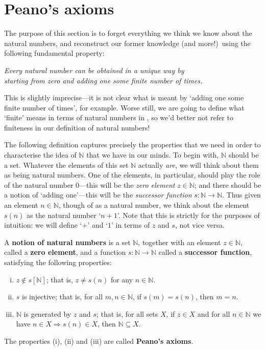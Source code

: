 \section{Peano's axioms}

The purpose of this section is to forget everything we think we know about the natural numbers, and reconstruct our former knowledge (and more!)\ using the following fundamental property:

\begin{center}
\textit{Every natural number can be obtained in a unique way by\\
starting from zero and adding one some finite number of times.}
\end{center}

This is slightly imprecise---it is not clear what is meant by `adding one some finite number of times', for example. Worse still, we are going to define what `finite' means in terms of natural numbers in , so we'd better not refer to finiteness in our definition of natural numbers!

The following definition captures precisely the properties that we need in order to characterise the idea of $\mathbb{N}$ that we have in our minds. To begin with, $\mathbb{N}$ should be a set. Whatever the elements of this set $\mathbb{N}$ actually \textit{are}, we will think about them as being natural numbers. One of the elements, in particular, should play the role of the natural number $0$---this will be the \textit{zero element} $z \in \mathbb{N}$; and there should be a notion of `adding one'---this will be the \textit{successor function} $s : \mathbb{N} \to \mathbb{N}$. Thus given an element $n \in \mathbb{N}$, though of as a natural number, we think about the element $s(n)$ as the natural number `$n+1$'. Note that this is strictly for the purposes of intuition: we will define `$+$' and `$1$' in terms of $z$ and $s$, not vice versa.

\begin{definition}
\label{defNotionOfNaturalNumbers}
A \textbf{notion of natural numbers} is a set $\mathbb{N}$, together with an element $z \in \mathbb{N}$, called a \textbf{zero element}, and a function $s : \mathbb{N} \to \mathbb{N}$ called a \textbf{successor function}, satisfying the following properties:
\begin{enumerate}[(i)]
\item $z \not\in s[\mathbb{N}]$; that is, $z \ne s(n)$ for any $n \in \mathbb{N}$.
\item $s$ is injective; that is, for all $m,n \in \mathbb{N}$, if $s(m) = s(n)$, then $m=n$.
\item $\mathbb{N}$ is generated by $z$ and $s$; that is, for all sets $X$, if $z \in X$ and for all $n \in \mathbb{N}$ we have $n \in X \Rightarrow s(n) \in X$, then $\mathbb{N} \subseteq X$.
\end{enumerate}
The properties (i), (ii) and (iii) are called \textbf{Peano's axioms}.
\end{definition}

